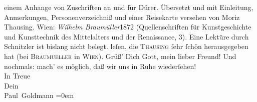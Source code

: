 \begin{ledgroupsized}[t]{13cm}
{{{                     einem Anhange von Zuschriften an und für Dürer. Übersetzt und mit Einleitung, Anmerkungen, Personenverzeichniß
                     und einer Reisekarte versehen von Moriz
                        Thausing. Wien: \emph{Wilhelm Braumüller}1872 (Quellenschriften für Kunstgeschichte und Kunsttechnik des
                     Mittelalters und der Renaissance, 3). Eine Lektüre durch Schnitzler ist bislang nicht belegt.}}}\label{K_L02627-22h}
               leſen, die \textsc{Thausing} ſehr ſchön herausgegeben hat (bei \textsc{Braumueller} in \textsc{Wien}).\pend
           \pstart
           Grüß’ Dich Gott, mein lieber Freund! Und nochmals: mach’ es möglich, daß wir uns
                  {\pb}in Ruhe wiederſehen! {\\[\baselineskip]}In Treue {\\[\baselineskip]}Dein {\\[\baselineskip]}\spacefill\mbox{Paul Goldmann}\pend
           \leftskip=0em{}\endnumbering{}\end{ledgroupsized}  \newcommand{\dateiname}{L02627}\newcommand{\titel}{Paul Goldmann an Arthur Schnitzler, 19. 6. [1894]}\newcommand{\editorInnen}{Martin Anton Müller und Laura Untner}
            \footnotesize
\begin{ledgroupsized}[t]{11.5cm}
\end{ledgroupsized}
         
      